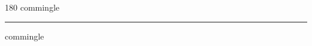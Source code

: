 
\begin{frame}
\begin{center}
\begin{turn}{180}
{\fontsize{2.5cm}{1em}\selectfont commingle}
\end{turn}
\vspace{1em}\par  
\hrule
\vspace{1em}\par  
{\fontsize{2.5cm}{1em}\selectfont commingle}
\end{center}
\end{frame}
